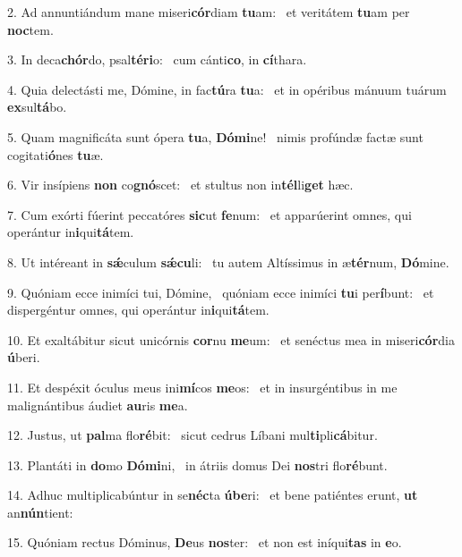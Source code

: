 2. Ad annuntiándum mane miseri\textbf{cór}diam \textbf{tu}am: \ast\  et veritátem \textbf{tu}am per \textbf{noc}tem.\

3. In deca\textbf{chór}do, psal\textbf{té}\textbf{ri}o: \ast\  cum cánti\textbf{co}, in \textbf{cí}thara.\

4. Quia delectásti me, Dómine, in fac\textbf{tú}ra \textbf{tu}a: \ast\  et in opéribus mánuum tuárum \textbf{ex}sul\textbf{tá}bo.\

5. Quam magnificáta sunt ópera \textbf{tu}a, \textbf{Dó}\textbf{mi}ne! \ast\  nimis profúndæ factæ sunt cogitati\textbf{ó}nes \textbf{tu}æ.\

6. Vir insípiens \textbf{non} co\textbf{gnó}scet: \ast\  et stultus non in\textbf{tél}li\textbf{get} hæc.\

7. Cum exórti fúerint peccatóres \textbf{sic}ut \textbf{fe}num: \ast\  et apparúerint omnes, qui operántur in\textbf{i}qui\textbf{tá}tem.\

8. Ut intéreant in \textbf{sǽ}culum \textbf{sǽ}\textbf{cu}li: \ast\  tu autem Altíssimus in æ\textbf{tér}num, \textbf{Dó}mine.\

9. Quóniam ecce inimíci tui, Dómine, \dag\  quóniam ecce inimíci \textbf{tu}i per\textbf{í}bunt: \ast\  et dispergéntur omnes, qui operántur in\textbf{i}qui\textbf{tá}tem.\

10. Et exaltábitur sicut unicórnis \textbf{cor}nu \textbf{me}um: \ast\  et senéctus mea in miseri\textbf{cór}dia \textbf{ú}beri.\

11. Et despéxit óculus meus ini\textbf{mí}cos \textbf{me}os: \ast\  et in insurgéntibus in me malignántibus áudiet \textbf{au}ris \textbf{me}a.\

12. Justus, ut \textbf{pal}ma flo\textbf{ré}bit: \ast\  sicut cedrus Líbani mul\textbf{ti}pli\textbf{cá}bitur.\

13. Plantáti in \textbf{do}mo \textbf{Dó}\textbf{mi}ni, \ast\  in átriis domus Dei \textbf{nos}tri flo\textbf{ré}bunt.\

14. Adhuc multiplicabúntur in se\textbf{néc}ta \textbf{ú}\textbf{be}ri: \ast\  et bene patiéntes erunt, \textbf{ut} an\textbf{nún}tient:\

15. Quóniam rectus Dóminus, \textbf{De}us \textbf{nos}ter: \ast\  et non est iníqui\textbf{tas} in \textbf{e}o.\

